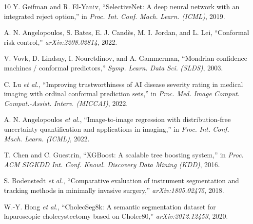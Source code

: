 \documentclass[runningheads]{llncs}
\begin{document}
\begin{thebibliography}{10}
 Y. Geifman and R. El-Yaniv, ``SelectiveNet: A deep
neural network with an integrated reject option,'' in \emph{Proc. Int. Conf.
Mach. Learn. (ICML)}, 2019.

 A. N. Angelopoulos, S. Bates, E. J. Cand\`es,
M. I. Jordan, and L. Lei, ``Conformal risk control,'' \emph{arXiv:2208.02814},
2022.

 V. Vovk, D. Lindsay, I. Nouretdinov, and
A. Gammerman, ``Mondrian confidence machines / conformal predictors,''
\emph{Symp. Learn. Data Sci. (SLDS)}, 2003.

 C. Lu \emph{et al.}, ``Improving trustworthiness of AI disease severity rating in
medical imaging with ordinal conformal prediction sets,'' in \emph{Proc. Med.
Image Comput. Comput.-Assist. Interv. (MICCAI)}, 2022.

 A. N. Angelopoulos \emph{et al.}, ``Image-to-image regression with distribution-free uncertainty quantification
and applications in imaging,'' in \emph{Proc. Int. Conf. Mach. Learn.
(ICML)}, 2022.

 T. Chen and C. Guestrin, ``XGBoost: A scalable tree
boosting system,'' in \emph{Proc. ACM SIGKDD Int. Conf. Knowl. Discovery Data
Mining (KDD)}, 2016.

 S. Bodenstedt \emph{et al.}, ``Comparative
evaluation of instrument segmentation and tracking methods in minimally
invasive surgery,'' \emph{arXiv:1805.02475}, 2018.

 W.-Y. Hong \emph{et al.}, ``CholecSeg8k: A semantic segmentation dataset for
laparoscopic cholecystectomy based on Cholec80,'' \emph{arXiv:2012.12453},
2020.

\end{thebibliography}
\end{document}
